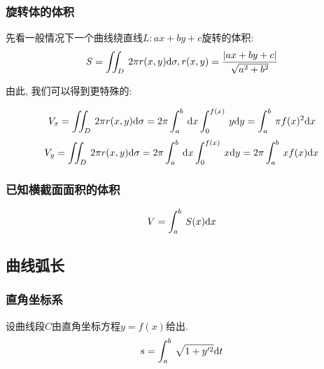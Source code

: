 \subsubsection{旋转体的体积}
先看一般情况下一个曲线绕直线$ L:ax+by+c $旋转的体积:
\begin{equation*}
S=\displaystyle\iint_{D}\hspace{.2em}2\pi r(x,y)\mathrm{d}\sigma, r(x,y)=\frac{|ax+by+c|}{\sqrt{a^{2}+b^{2}}}
\end{equation*}\par
由此, 我们可以得到更特殊的:\par \vspace{.5em}
\begin{equation*}
V_{x}=\displaystyle\iint_{D}\hspace{.2em}2\pi r(x,y)\mathrm{d}\sigma=2\pi\displaystyle\int_{a}^{b}\hspace{.2em}\mathrm{d}x\displaystyle\int_{0}^{f(x)}\hspace{.2em}y \mathrm{d}y=\displaystyle\int_{a}^{b}\hspace{.2em}\pi f(x)^{2}\mathrm{d}x
\end{equation*}
\begin{equation*}
V_{y}=\displaystyle\iint_{D}\hspace{.2em}2\pi r(x,y)\mathrm{d}\sigma=2\pi\displaystyle\int_{a}^{b}\hspace{.2em}\mathrm{d}x\displaystyle\int_{0}^{f(x)}\hspace{.2em}x \mathrm{d}y=2\pi\displaystyle\int_{a}^{b}\hspace{.2em}xf(x)\mathrm{d}x
\end{equation*}
\subsubsection{已知横截面面积的体积}
\begin{equation*}
V=\displaystyle\int_{a}^{b}\hspace{.2em}S(x)\mathrm{d}x
\end{equation*}
\subsection{曲线弧长}
\subsubsection{直角坐标系}
设曲线段$ C $由直角坐标方程$ y=f(x) $给出.
\begin{equation*}
s=\displaystyle\int_{a}^{b}\hspace{.2em}\sqrt{1+y'^{2}}\mathrm{d}t
\end{equation*}
